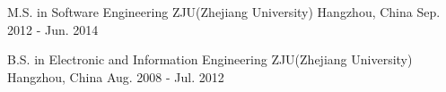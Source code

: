 

\begin{cventries}

  \cventry
    {M.S. in Software Engineering}
    {ZJU(Zhejiang University)} %
    {Hangzhou, China} %
    {Sep. 2012 - Jun. 2014} %
    {
    }

  \cventry
    {B.S. in Electronic and Information Engineering} %
    {ZJU(Zhejiang University)} %
    {Hangzhou, China} %
    {Aug. 2008 - Jul. 2012} %
    {
      \begin{cvitems} %
      \end{cvitems}
    }

\end{cventries}
